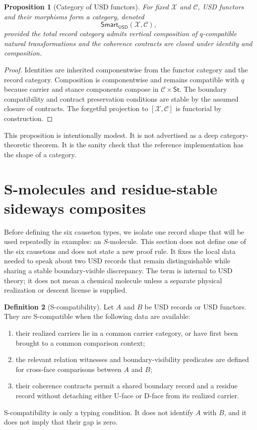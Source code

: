 \documentclass[11pt]{article}
\newcommand{\USD}{\mathsf{USD}}
\newcommand{\St}{\mathsf{St}}
\newcommand{\Smart}{\mathsf{Smart}}
\theoremstyle{definition}
\newtheorem{definition}{Definition}[section]
\theoremstyle{plain}
\newtheorem{proposition}[definition]{Proposition}
\begin{document}
\begin{proposition}[Category of USD functors]
For fixed $\mathcal X$ and $\mathcal C$, USD functors and their morphisms
form a category, denoted
\[
  \Smart_{\USD}(\mathcal X,\mathcal C),
\]
provided the total record category admits vertical composition of
$q$-compatible natural transformations and the coherence contracts are
closed under identity and composition.
\end{proposition}

\begin{proof}
Identities are inherited componentwise from the functor category and the
record category.  Composition is componentwise and remains compatible
with $q$ because carrier and stance components compose in
$\mathcal C\times\St$.  The boundary compatibility and contract
preservation conditions are stable by the assumed closure of contracts.  The forgetful projection to $[\mathcal X,\mathcal C]$ is
functorial by construction.
\end{proof}

This proposition is intentionally modest.  It is not advertised as a deep
category-theoretic theorem.  It is the sanity check that the reference
implementation has the shape of a category.

\section{S-molecules and residue-stable sideways composites}

Before defining the six causeton types, we isolate one record shape that
will be used repeatedly in examples: an \(S\)-molecule.  This section does
not define one of the six causetons and does not state a new proof rule.
It fixes the local data needed to speak about two USD records that remain
distinguishable while sharing a stable boundary-visible discrepancy.  The term is internal
to USD theory; it does not mean a chemical molecule unless a separate
physical realization or descent license is supplied.

\begin{definition}[S-compatibility]
Let \(A\) and \(B\) be USD records or USD functors.  They are
S-compatible when the following data are available:
\begin{enumerate}[label=(\roman*),leftmargin=*]
  \item their realized carriers lie in a common carrier category, or have
  first been brought to a common comparison context;
  \item the relevant relation witnesses and boundary-visibility predicates
  are defined for cross-face comparisons between \(A\) and \(B\);
  \item their coherence contracts permit a shared boundary record and a
  residue record without detaching either U-face or D-face from its
  realized carrier.
\end{enumerate}
S-compatibility is only a typing condition.  It does not identify \(A\)
with \(B\), and it does not imply that their gap is zero.
\end{definition}
\end{document}
